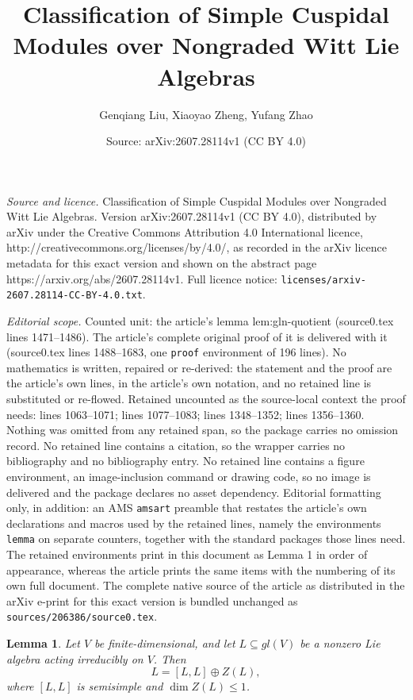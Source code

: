 \documentclass[10pt,a4paper]{amsart}
\title{Classification of Simple Cuspidal Modules over Nongraded Witt Lie Algebras}
\author{Genqiang Liu, Xiaoyao Zheng, Yufang Zhao}
\date{Source: arXiv:2607.28114v1 (CC BY 4.0)}
\newtheorem{lemma}{Lemma}
\def\gl{gl}%
\begin{document}
\maketitle

\noindent\emph{Source and licence.} Classification of Simple Cuspidal Modules over Nongraded Witt Lie Algebras. Version arXiv:2607.28114v1 (CC BY 4.0), distributed by arXiv under the Creative Commons Attribution 4.0 International licence, http://creativecommons.org/licenses/by/4.0/, as recorded in the arXiv licence metadata for this exact version and shown on the abstract page https://arxiv.org/abs/2607.28114v1. Full licence notice: \texttt{licenses/arxiv-2607.28114-CC-BY-4.0.txt}.\par\smallskip

\noindent\textit{Editorial scope.} Counted unit: the article's lemma lem:gln-quotient (source0.tex lines 1471--1486). The article's complete original proof of it is delivered with it (source0.tex lines 1488--1683, one \texttt{proof} environment of 196 lines). No mathematics is written, repaired or re-derived: the statement and the proof are the article's own lines, in the article's own notation, and no retained line is substituted or re-flowed.  Retained uncounted as the source-local context the proof needs: lines 1063--1071; lines 1077--1083; lines 1348--1352; lines 1356--1360.  Nothing was omitted from any retained span, so the package carries no omission record.  No retained line contains a citation, so the wrapper carries no bibliography and no bibliography entry.  No retained line contains a figure environment, an image-inclusion command or drawing code, so no image is delivered and the package declares no asset dependency.  Editorial formatting only, in addition: an AMS \texttt{amsart} preamble that restates the article's own declarations and macros used by the retained lines, namely the environments \texttt{lemma} on separate counters, together with the standard packages those lines need.  The retained environments print in this document as Lemma 1 in order of appearance, whereas the article prints the same items with the numbering of its own full document.  The complete native source of the article as distributed in the arXiv e-print for this exact version is bundled unchanged as \texttt{sources/206386/source0.tex}.
\begin{lemma}\label{Hu}
Let \(V\) be finite-dimensional, and let
\(L\subseteq\gl(V)\) be a nonzero Lie algebra acting irreducibly on
\(V\). Then
\[
L=[L,L]\oplus Z(L),
\]
where \([L,L]\) is semisimple and \(\dim Z(L)\leq1\).
\end{lemma}
\end{document}
